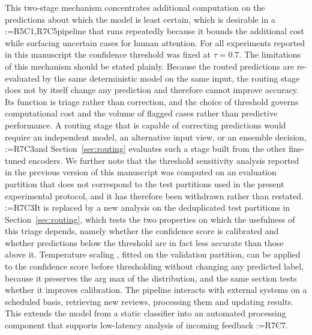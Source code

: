 \documentclass[a4paper,fleqn]{cas-sc}
\makeatletter
\newif\iftracked
\newcommand{\rv@setcolour}[1]{%
  \IfStrEq{#1}{R7C7}{\color{rvEdit}}{%
    \IfSubStr{#1}{R5}{\IfSubStr{#1}{R7}{\color{rvBoth}}{\color{rvFive}}}{\color{rvSeven}}}}
\newcommand{\rv@tag}[1]{\textsuperscript{\sffamily\bfseries\scriptsize[\StrSubstitute{#1}{,}{, }]}\,}
\newcommand{\rv@recordone}[1]{%
  \edef\rv@i{#1}%
  \ifcsdef{rv@n@\rv@i}{}{\csgdef{rv@n@\rv@i}{0}}%
  \csxdef{rv@n@\rv@i}{\the\numexpr\csuse{rv@n@\rv@i}+1\relax}%
  \begingroup\edef\@currentlabel{\rv@i}\label{rv:\rv@i:\csuse{rv@n@\rv@i}}\endgroup}
\newcommand{\rv@record}[1]{\@for\rv@id:=#1\do{\expandafter\rv@recordone\expandafter{\rv@id}}}
\DeclareRobustCommand{\rcrep}[3]{\rv@record{#1}\iftracked{\rv@setcolour{#1}\rv@tag{#1}\rv@strike{#2} #3}\else#3\fi}
\DeclareRobustCommand{\rce}[1]{\rv@record{R7C7}\iftracked{\color{rvEdit}#1}\else#1\fi}
\makeatother
\begin{document}
This two-stage mechanism concentrates additional computation on the predictions about which the model is least certain, which is desirable in a \rcrep{R5C1,R7C5}{continuously operating pipeline}{pipeline that runs repeatedly} because it bounds the additional cost while surfacing uncertain cases for human attention. For all experiments reported in this manuscript the confidence threshold was fixed at $\tau = 0.7$. The limitations of this mechanism should be stated plainly. Because the routed predictions are re-evaluated by the same deterministic model on the same input, the routing stage does not by itself change any prediction and therefore cannot improve accuracy. Its function is triage rather than correction, and the choice of threshold governs computational cost and the volume of flagged cases rather than predictive performance. A routing stage that is capable of correcting predictions would require an independent model, an alternative input view, or an ensemble decision, \rcrep{R7C3}{and the design and empirical evaluation of such a stage remain future work.}{and Section~\ref{sec:routing} evaluates such a stage built from the other fine-tuned encoders.} We further note that the threshold sensitivity analysis reported in the previous version of this manuscript was computed on an evaluation partition that does not correspond to the test partitions used in the present experimental protocol, and it has therefore been withdrawn rather than restated. \rcrep{R7C3}{This is recorded as an open item in Section 8.}{It is replaced by a new analysis on the deduplicated test partitions in Section~\ref{sec:routing}, which tests the two properties on which the usefulness of this triage depends, namely whether the confidence score is calibrated and whether predictions below the threshold are in fact less accurate than those above it. Temperature scaling \citep{guo2017calibration}, fitted on the validation partition, can be applied to the confidence score before thresholding without changing any predicted label, because it preserves the arg max of the distribution, and the same section tests whether it improves calibration.} The pipeline interacts with external systems on a scheduled basis, retrieving new reviews, processing them and updating results. This extends the model from a static classifier into an automated processing component that supports low-latency analysis of incoming feedback \rce{\citep{sharma2026toward}}.
\end{document}
